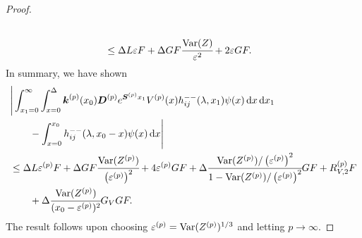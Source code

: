 \begin{proof}
\begin{align}
		\\&\leq \Delta L\varepsilon   F 
		+\Delta GF \cfrac{\mathrm{Var}(Z)}{\varepsilon^2} + 2\varepsilon GF.\label{eqn: LLLaase}
	\end{align}
	In summary, we have shown 
	\begin{align}
		&\Bigg|\int_{x_1=0}^\infty \int_{x=0}^{\Delta}\boldsymbol k^{(p)}(x_0) \boldsymbol D^{(p)} e^{\boldsymbol S^{(p)} x_1} V^{(p)}(x) h_{ij}^{--}(\lambda, x_1) \psi(x) \, \mathrm{d} x \, \mathrm{d} x_1 \nonumber
		\\&\qquad{}- \int_{x=0}^{x_0} h_{ij}^{--}(\lambda,x_0-x)\psi(x)\, \mathrm{d} x \Bigg| \nonumber 
		\\& \leq  \Delta L\varepsilon^{(p)}   F 
		+\Delta GF \cfrac{\mathrm{Var}(Z^{(p)})}{\left(\varepsilon^{(p)}\right)^2} + 4\varepsilon^{(p)} GF + \Delta \cfrac{\mathrm{Var}(Z^{(p)})/\left(\varepsilon^{(p)}\right)^2}{1-\mathrm{Var}(Z^{(p)})/\left(\varepsilon^{(p)}\right)^2}GF + R_{V,2}^{(p)} F \nonumber
		\\&\qquad{} +  \Delta \cfrac{\mathrm{Var}(Z^{(p)})}{(x_0-\varepsilon^{(p)})^2} G_V G F.
	\end{align}
	The result follows upon choosing \(\varepsilon^{(p)}=\mathrm{Var}(Z^{(p)})^{1/3}\) and letting \(p\to\infty\). 
\end{proof}

